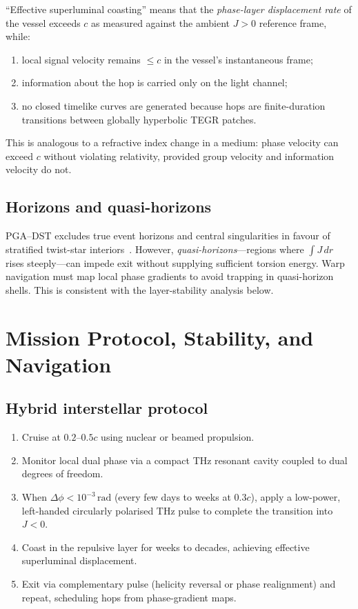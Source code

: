 \documentclass[dvipdfmx,a4paper]{article}
\theoremstyle{definition}
\begin{document}
``Effective superluminal coasting'' means that the \emph{phase-layer displacement rate} of the vessel exceeds $c$ as measured against the ambient $J>0$ reference frame, while:
\begin{enumerate}[leftmargin=2em]
  \item local signal velocity remains $\le c$ in the vessel's instantaneous frame;
  \item information about the hop is carried only on the light channel;
  \item no closed timelike curves are generated because hops are finite-duration transitions between globally hyperbolic TEGR patches.
\end{enumerate}

This is analogous to a refractive index change in a medium: phase velocity can exceed $c$ without violating relativity, provided group velocity and information velocity do not.

\subsection{Horizons and quasi-horizons}

PGA--DST excludes true event horizons and central singularities in favour of stratified twist-star interiors~\cite{dual2025}. However, \emph{quasi-horizons}---regions where $\int J\,dr$ rises steeply---can impede exit without supplying sufficient torsion energy. Warp navigation must map local phase gradients to avoid trapping in quasi-horizon shells. This is consistent with the layer-stability analysis below.

\section{Mission Protocol, Stability, and Navigation}
\label{sec:mission}

\subsection{Hybrid interstellar protocol}

\begin{enumerate}[leftmargin=2em]
  \item Cruise at $0.2$--$0.5c$ using nuclear or beamed propulsion.
  \item Monitor local dual phase via a compact THz resonant cavity coupled to dual degrees of freedom.
  \item When $\Delta\phi<10^{-3}\,\mathrm{rad}$ (every few days to weeks at $0.3c$), apply a low-power, left-handed circularly polarised THz pulse to complete the transition into $J<0$.
  \item Coast in the repulsive layer for weeks to decades, achieving effective superluminal displacement.
  \item Exit via complementary pulse (helicity reversal or phase realignment) and repeat, scheduling hops from phase-gradient maps.
\end{enumerate}
\end{document}
